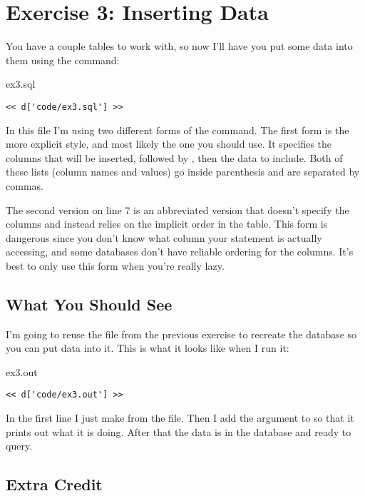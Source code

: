 \chapter{Exercise 3: Inserting Data}

You have a couple tables to work with, so now I'll have you put some data into them
using the  command:

\begin{code}{ex3.sql}
\begin{Verbatim}
<< d['code/ex3.sql'] >>
\end{Verbatim}
\end{code}

In this file I'm using two different forms of the  command.
The first form is the more explicit style, and most likely the one you should
use.  It specifies the columns that will be inserted, followed by ,
then the data to include.  Both of these lists (column names and values)
go inside parenthesis and are separated by commas.

The second version on line 7 is an abbreviated version that doesn't specify
the columns and instead relies on the implicit order in the table.  This form
is dangerous since you don't know what column your statement is actually 
accessing, and some databases don't have reliable ordering for the columns.
It's best to only use this form when you're really lazy.

\section{What You Should See}

I'm going to reuse the  file from the previous exercise to
recreate the database so you can put data into it.  This is what it looks
like when I run it:

\begin{code}{ex3.out}
\begin{Verbatim}
<< d['code/ex3.out'] >>
\end{Verbatim}
\end{code}

In the first line I just make  from the  file.
Then I add the  argument to  so that it
prints out what it is doing.  After that the data is in the database
and ready to query.

\section{Extra Credit}


